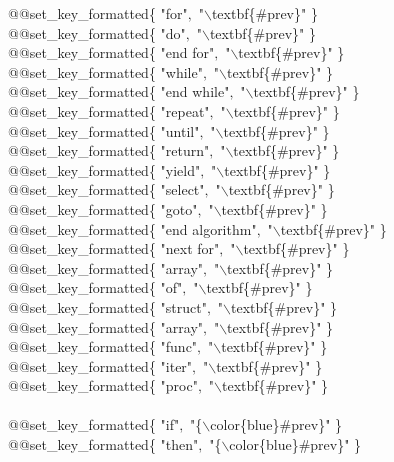\tb @@set\_key\_formatted\{ "for"$,$ "$\backslash$textbf\{\#prev\}" \} \\
\tb @@set\_key\_formatted\{ "do"$,$ "$\backslash$textbf\{\#prev\}" \} \\
\tb @@set\_key\_formatted\{ "end for"$,$ "$\backslash$textbf\{\#prev\}" \} \\
\tb @@set\_key\_formatted\{ "while"$,$ "$\backslash$textbf\{\#prev\}" \} \\
\tb @@set\_key\_formatted\{ "end while"$,$ "$\backslash$textbf\{\#prev\}" \} \\
\tb @@set\_key\_formatted\{ "repeat"$,$ "$\backslash$textbf\{\#prev\}" \} \\
\tb @@set\_key\_formatted\{ "until"$,$ "$\backslash$textbf\{\#prev\}" \} \\
\tb @@set\_key\_formatted\{ "return"$,$ "$\backslash$textbf\{\#prev\}" \} \\
\tb @@set\_key\_formatted\{ "yield"$,$ "$\backslash$textbf\{\#prev\}" \} \\
\tb @@set\_key\_formatted\{ "select"$,$ "$\backslash$textbf\{\#prev\}" \} \\
\tb @@set\_key\_formatted\{ "goto"$,$ "$\backslash$textbf\{\#prev\}" \} \\
\tb @@set\_key\_formatted\{ "end algorithm"$,$ "$\backslash$textbf\{\#prev\}" \} \\
\tb @@set\_key\_formatted\{ "next for"$,$ "$\backslash$textbf\{\#prev\}" \} \\
\tb @@set\_key\_formatted\{ "array"$,$ "$\backslash$textbf\{\#prev\}" \} \\
\tb @@set\_key\_formatted\{ "of"$,$ "$\backslash$textbf\{\#prev\}" \} \\
\tb @@set\_key\_formatted\{ "struct"$,$ "$\backslash$textbf\{\#prev\}" \} \\
\tb @@set\_key\_formatted\{ "array"$,$ "$\backslash$textbf\{\#prev\}" \} \\
\tb @@set\_key\_formatted\{ "func"$,$ "$\backslash$textbf\{\#prev\}" \} \\
\tb @@set\_key\_formatted\{ "iter"$,$ "$\backslash$textbf\{\#prev\}" \} \\
\tb @@set\_key\_formatted\{ "proc"$,$ "$\backslash$textbf\{\#prev\}" \} \\
\\
\tb @@set\_key\_formatted\{ "if"$,$ "\{$\backslash$color\{blue\}\#prev\}" \} \\
\tb @@set\_key\_formatted\{ "then"$,$ "\{$\backslash$color\{blue\}\#prev\}" \} \\
